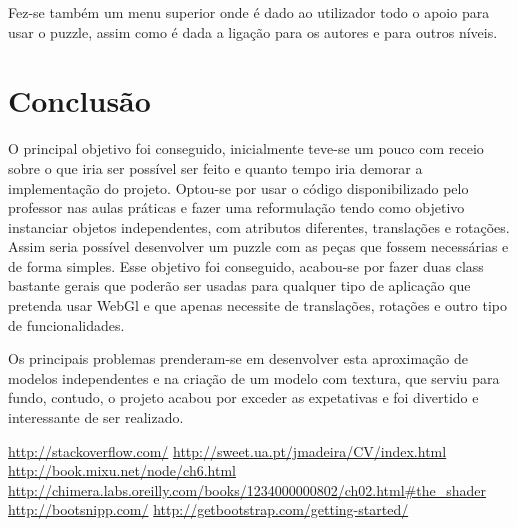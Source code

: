 \documentclass[pdftex,12pt,a4paper]{report}
\begin{document}
Fez-se também um menu superior onde é dado ao utilizador todo o apoio para usar o puzzle, assim como é dada a ligação para os autores e para outros níveis.


\section{Conclusão}

O principal objetivo foi conseguido, inicialmente teve-se um pouco com receio sobre o que iria ser possível ser feito e quanto tempo iria demorar a implementação do projeto. Optou-se por usar o código disponibilizado pelo professor nas aulas práticas e fazer uma reformulação tendo como objetivo instanciar objetos independentes, com atributos diferentes, translações e rotações. Assim seria possível desenvolver um puzzle com as peças que fossem necessárias e de forma simples. Esse objetivo foi conseguido, acabou-se por fazer duas class bastante gerais que poderão ser usadas para qualquer tipo de aplicação que pretenda usar WebGl e que apenas necessite de translações, rotações e outro tipo de funcionalidades.

Os principais problemas prenderam-se em desenvolver esta aproximação de modelos independentes e na criação de um modelo com textura, que serviu para fundo, contudo, o projeto acabou por exceder as expetativas e foi divertido e interessante de ser realizado.

\renewcommand{\bibname}{Referências}

\begin{thebibliography}{} 
	 \url{http://stackoverflow.com/}
	\url{http://sweet.ua.pt/jmadeira/CV/index.html}
	 \url{http://book.mixu.net/node/ch6.html}
	 \url{http://chimera.labs.oreilly.com/books/1234000000802/ch02.html#the_shader}
	 \url{http://bootsnipp.com/}
	 \url{http://getbootstrap.com/getting-started/}
\end{thebibliography}
\end{document}
